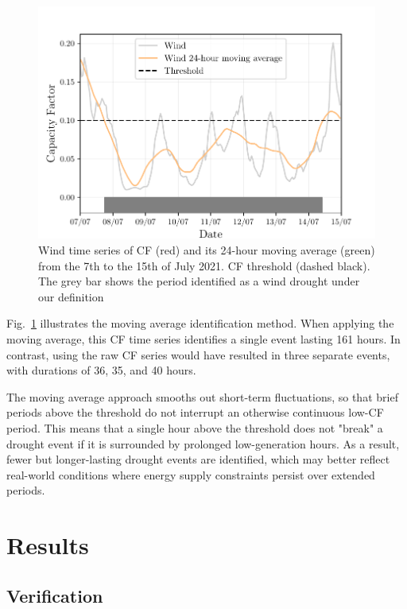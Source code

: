 \documentclass[a4paper, 11pt]{article}
\begin{document}
\begin{figure}[ht!]
	\centering
	\includegraphics[width=\textwidth]{droughts_methodology}
	\caption{Wind time series of CF (red) and its 24-hour moving average (green) from the 7th to the 15th of July 2021. CF threshold (dashed black). The grey bar shows the period identified as a wind drought under our definition}
	\label{fig:find_res_droughts}
\end{figure}

Fig.~\ref{fig:find_res_droughts} illustrates the moving average identification method. When applying the moving average, this CF time series identifies a single event lasting 161 hours. In contrast, using the raw CF series would have resulted in three separate events, with durations of 36, 35, and 40 hours.

The moving average approach smooths out short-term fluctuations, so that brief periods above the threshold do not interrupt an otherwise continuous low-CF period. This means that a single hour above the threshold does not "break" a drought event if it is surrounded by prolonged low-generation hours. As a result, fewer but longer-lasting drought events are identified, which may better reflect real-world conditions where energy supply constraints persist over extended periods.

\section{Results}
\label{sec:Results}

\subsection{Verification}
\label{sec:verification}
\end{document}
